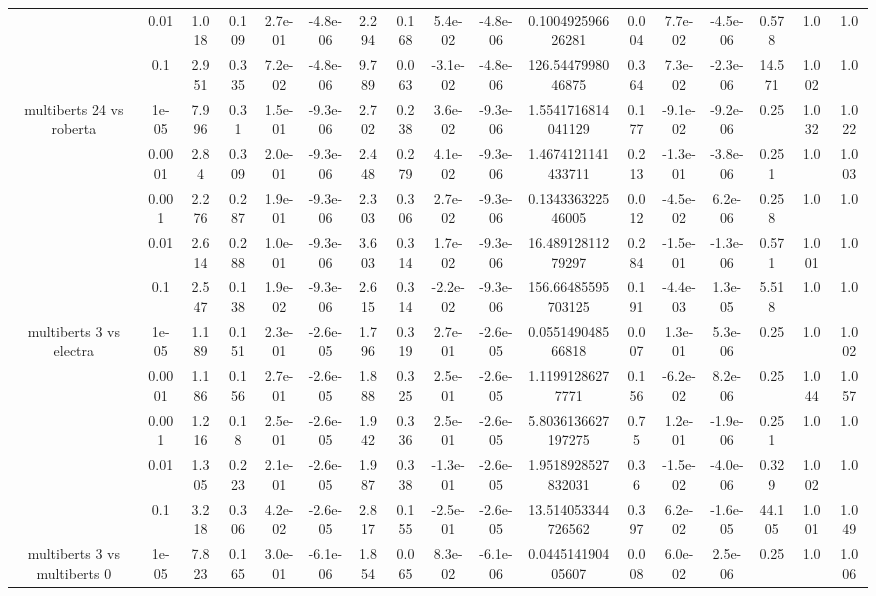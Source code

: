 \begin{tabular}{|c|c|c|c|c|c|c|c|c|c|c|c|c|c|c|c|c|}
 & 0.01 & 1.018 & 0.109 & 2.7e-01 & -4.8e-06 & 2.294 & 0.168 & 5.4e-02 & -4.8e-06 & 0.100492596626281 & 0.004 & 7.7e-02 & -4.5e-06 & 0.578 & 1.0 & 1.0 \\
 & 0.1 & 2.951 & 0.335 & 7.2e-02 & -4.8e-06 & 9.789 & 0.063 & -3.1e-02 & -4.8e-06 & 126.5447998046875 & 0.364 & 7.3e-02 & -2.3e-06 & 14.571 & 1.002 & 1.0 \\
\hline
\multirow{5}{*}{multiberts 24 vs roberta } & 1e-05 & 7.996 & 0.31 & 1.5e-01 & -9.3e-06 & 2.702 & 0.238 & 3.6e-02 & -9.3e-06 & 1.5541716814041129 & 0.177 & -9.1e-02 & -9.2e-06 & 0.25 & 1.032 & 1.022 \\
 & 0.0001 & 2.84 & 0.309 & 2.0e-01 & -9.3e-06 & 2.448 & 0.279 & 4.1e-02 & -9.3e-06 & 1.4674121141433711 & 0.213 & -1.3e-01 & -3.8e-06 & 0.251 & 1.0 & 1.003 \\
 & 0.001 & 2.276 & 0.287 & 1.9e-01 & -9.3e-06 & 2.303 & 0.306 & 2.7e-02 & -9.3e-06 & 0.134336322546005 & 0.012 & -4.5e-02 & 6.2e-06 & 0.258 & 1.0 & 1.0 \\
 & 0.01 & 2.614 & 0.288 & 1.0e-01 & -9.3e-06 & 3.603 & 0.314 & 1.7e-02 & -9.3e-06 & 16.48912811279297 & 0.284 & -1.5e-01 & -1.3e-06 & 0.571 & 1.001 & 1.0 \\
 & 0.1 & 2.547 & 0.138 & 1.9e-02 & -9.3e-06 & 2.615 & 0.314 & -2.2e-02 & -9.3e-06 & 156.66485595703125 & 0.191 & -4.4e-03 & 1.3e-05 & 5.518 & 1.0 & 1.0 \\
\hline
\multirow{5}{*}{multiberts 3 vs electra } & 1e-05 & 1.189 & 0.151 & 2.3e-01 & -2.6e-05 & 1.796 & 0.319 & 2.7e-01 & -2.6e-05 & 0.055149048566818 & 0.007 & 1.3e-01 & 5.3e-06 & 0.25 & 1.0 & 1.002 \\
 & 0.0001 & 1.186 & 0.156 & 2.7e-01 & -2.6e-05 & 1.888 & 0.325 & 2.5e-01 & -2.6e-05 & 1.11991286277771 & 0.156 & -6.2e-02 & 8.2e-06 & 0.25 & 1.044 & 1.057 \\
 & 0.001 & 1.216 & 0.18 & 2.5e-01 & -2.6e-05 & 1.942 & 0.336 & 2.5e-01 & -2.6e-05 & 5.8036136627197275 & 0.75 & 1.2e-01 & -1.9e-06 & 0.251 & 1.0 & 1.0 \\
 & 0.01 & 1.305 & 0.223 & 2.1e-01 & -2.6e-05 & 1.987 & 0.338 & -1.3e-01 & -2.6e-05 & 1.9518928527832031 & 0.36 & -1.5e-02 & -4.0e-06 & 0.329 & 1.002 & 1.0 \\
 & 0.1 & 3.218 & 0.306 & 4.2e-02 & -2.6e-05 & 2.817 & 0.155 & -2.5e-01 & -2.6e-05 & 13.514053344726562 & 0.397 & 6.2e-02 & -1.6e-05 & 44.105 & 1.001 & 1.049 \\
\hline
\multirow{5}{*}{multiberts 3 vs multiberts 0} & 1e-05 & 7.823 & 0.165 & 3.0e-01 & -6.1e-06 & 1.854 & 0.065 & 8.3e-02 & -6.1e-06 & 0.044514190405607 & 0.008 & 6.0e-02 & 2.5e-06 & 0.25 & 1.0 & 1.006 \\

\end{tabular}
